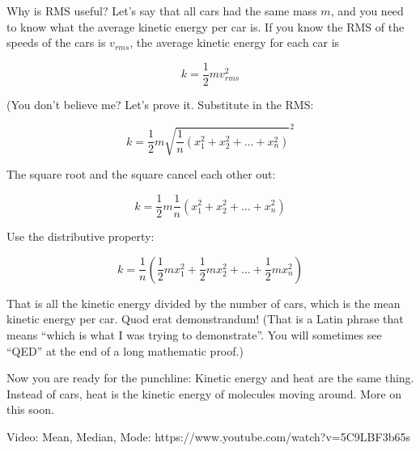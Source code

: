 Why is RMS useful? Let's say that all cars had the same mass $m$, and
you need to know what the average kinetic energy per car is. If you
know the RMS of the speeds of the cars is $v_{rms}$, the average kinetic energy for
each car is

$$k = \frac{1}{2}m v_{rms}^2$$

(You don't believe me? Let's prove it. Substitute in the RMS:

$$k = \frac{1}{2}m \sqrt{\frac{1}{n}\left( x_1^2 + x_2^2 + \ldots + x_n^2 \right)}^2$$

The square root and the square cancel each other out:

$$k = \frac{1}{2}m \frac{1}{n}\left( x_1^2 + x_2^2 + \ldots + x_n^2 \right)$$

Use the distributive property:

$$k = \frac{1}{n} \left( \frac{1}{2} m x_1^2 + \frac{1}{2}m x_2^2 + \ldots + \frac{1}{2}m x_n^2 \right)$$


That is all the kinetic energy divided by the number of cars, which is
the mean kinetic energy per car. Quod erat demonstrandum! (That is a
Latin phrase that means ``which is what I was trying to
demonstrate''. You will sometimes see ``QED'' at the end of a long
mathematic proof.)

Now you are ready for the punchline: Kinetic energy and heat are the
same thing. Instead of cars, heat is the kinetic energy of molecules
moving around. More on this soon.

Video: Mean, Median, Mode: https://www.youtube.com/watch?v=5C9LBF3b65s


